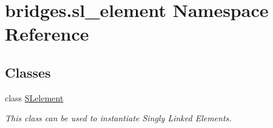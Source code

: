 \hypertarget{namespacebridges_1_1sl__element}{}\section{bridges.\+sl\+\_\+element Namespace Reference}
\label{namespacebridges_1_1sl__element}
\subsection*{Classes}
\begin{DoxyCompactItemize}
\item 
class \mbox{\hyperlink{classbridges_1_1sl__element_1_1_s_lelement}{S\+Lelement}}
\begin{DoxyCompactList}\small\item\em This class can be used to instantiate Singly Linked Elements. \end{DoxyCompactList}\end{DoxyCompactItemize}
